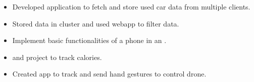  
\begin{itemize}
    \item Developed  application to fetch and store used car data from multiple clients.
    \item Stored data in  cluster and used  webapp to filter data.
 \end{itemize}
\begin{itemize}
    \item Implement basic functionalities of a phone in an .
 \end{itemize}
 \begin{itemize}
    \item {} and  project to track calories.
\end{itemize}
\begin{itemize}
   \item Created  app to track and send hand gestures to control drone.
\end{itemize}